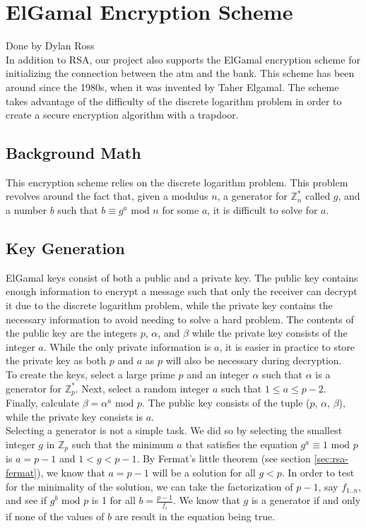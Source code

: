 \section{ElGamal Encryption Scheme}\label{sec:elgamal}
Done by Dylan Ross\\

	\medskip
	In addition to RSA, our project also supports the ElGamal encryption scheme for initializing the connection between the atm and the bank. This scheme has been around since the 1980s, when it was
	invented by Taher Elgamal. The scheme takes advantage of the difficulty of the discrete logarithm problem in order to create a secure encryption algorithm with a trapdoor.

	\subsection{Background Math}\label{sec:elgamal-background}
		This encryption scheme relies on the discrete logarithm problem. This problem revolves around the fact that, given a modulus $n$, a generator for $\mathbb{Z}_n^*$ called $g$, and a number
		$b$ such that $b\equiv g^a\text{ mod }n$ for some $a$, it is difficult to solve for $a$.

	\subsection{Key Generation}\label{sec:elgamel-keys}
		ElGamal keys consist of both a public and a private key. The public key contains enough information to encrypt a message such that only the receiver can decrypt it due to the discrete
		logarithm problem, while the private key contains the necessary information to avoid needing to solve a hard problem. The contents of the public key are the integers $p$, $\alpha$, and
		$\beta$ while the private key consists of the integer $a$. While the only private information is $a$, it is easier in practice to store the private key as both $p$ and $a$ as $p$ will
		also be necessary during decryption.\\

		To create the keys, select a large prime $p$ and an integer $\alpha$ such that $\alpha$ is a generator for $\mathbb{Z}_p^*$. Next, select a random integer $a$ such that $1\le a\le p-2$.
		Finally, calculate $\beta=\alpha^a\text{ mod }p$. The public key consists of the tuple ($p$, $\alpha$, $\beta$), while the private key consists is $a$.\\

		Selecting a generator is not a simple task. We did so by selecting the smallest integer $g$ in $\mathbb{Z}_p$ such that the minimum $a$ that satisfies the equation $g^a\equiv1\text{ mod }p$
		is $a=p-1$ and $1<g<p-1$. By Fermat's little theorem (see section \ref{sec:rsa-fermat}), we know that $a=p-1$ will be a solution for all $g<p$. In order to test for the minimality of
		the solution, we can take the factorization of $p-1$, say $f_{1..n}$, and see if $g^b\text{ mod }p$ is 1 for all $b=\frac{p-1}{f_i}$. We know that $g$ is a generator if and only if
		none of the values of $b$ are result in the equation being true.

